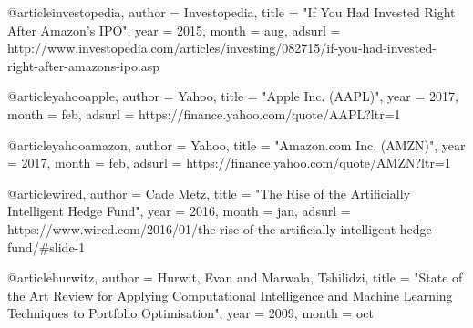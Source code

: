 @article{investopedia,
   author = {{Investopedia}},
    title = "{If You Had Invested Right After Amazon's IPO}",
     year = 2015,
    month = aug,
   adsurl = {http://www.investopedia.com/articles/investing/082715/if-you-had-invested-right-after-amazons-ipo.asp}
}

@article{yahooapple,
   author = {{Yahoo}},
    title = "{Apple Inc. (AAPL)}",
     year = 2017,
    month = feb,
   adsurl = {https://finance.yahoo.com/quote/AAPL?ltr=1}
}

@article{yahooamazon,
   author = {{Yahoo}},
    title = "{Amazon.com Inc. (AMZN)}",
     year = 2017,
    month = feb,
   adsurl = {https://finance.yahoo.com/quote/AMZN?ltr=1}
}

@article{wired,
   author = {{Cade Metz}},
    title = "{The Rise of the Artificially Intelligent Hedge Fund}",
     year = 2016,
    month = jan,
   adsurl = {https://www.wired.com/2016/01/the-rise-of-the-artificially-intelligent-hedge-fund/#slide-1}
}

@article{hurwitz,
   author = {Hurwit, Evan and Marwala, Tshilidzi},
    title = "{State of the Art Review for Applying Computational Intelligence and Machine Learning Techniques to Portfolio Optimisation}",
     year = 2009,
    month = oct
}
